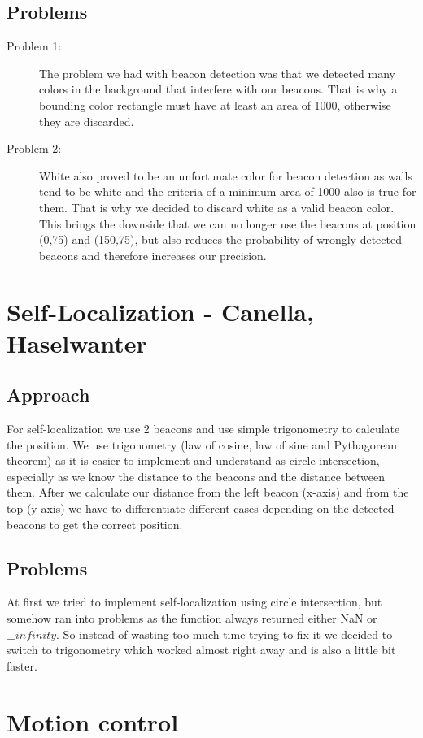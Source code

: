 \documentclass[703031]{iisreport}
\begin{document}
\subsection{Problems}
	\begin{description}
		\item [Problem 1:] The problem we had with beacon detection was that we detected many colors in the background that interfere with our beacons. That is why a bounding color rectangle must have at least an area of 1000, otherwise they are discarded.
		\item [Problem 2:] White also proved to be an unfortunate color for beacon detection as walls tend to be white and the criteria of a minimum area of 1000 also is true for them. That is why we decided to discard white as a valid beacon color. This brings the downside that we can no longer use the beacons at position (0,75) and (150,75), but also reduces the probability of wrongly detected beacons and therefore increases our precision.
	\end{description}


\section{Self-Localization - Canella, Haselwanter}
\subsection{Approach}
For self-localization we use 2 beacons and use simple trigonometry to calculate the position. We use trigonometry (law of cosine, law of sine and Pythagorean theorem) as it is easier to implement and understand as circle intersection, especially as we know the distance to the beacons and the distance between them.
After we calculate our distance from the left beacon (x-axis) and from the top (y-axis) we have to differentiate different cases depending on the detected beacons to get the correct position.
\subsection{Problems}
At first we tried to implement self-localization using circle intersection, but somehow ran into problems as the function always returned either NaN or $\pm infinity$. So instead of wasting too much time trying to fix it we decided to switch to trigonometry which worked almost right away and is also a little bit faster.
\section{Motion control}
\end{document}
